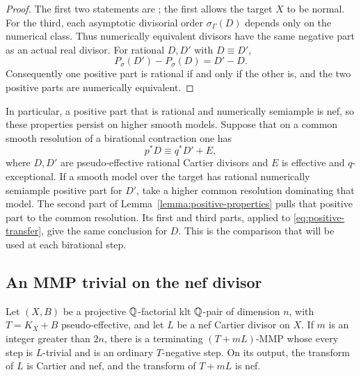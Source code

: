 \begin{proof}
The first two statements are \cite[Lemmas 2.4 and 2.5]{LP}; the first
allows the target $X$ to be normal.  For the third, each asymptotic
divisorial order $\sigma_\Gamma(D)$ depends only on the numerical class.
Thus numerically equivalent divisors have the same negative part as
an actual real divisor.  For rational $D,D'$ with $D\equiv D'$,
\[
                  P_\sigma(D')-P_\sigma(D)=D'-D.
\]
Consequently one positive part is rational if and only if the other
is, and the two positive parts are numerically equivalent.
\end{proof}

In particular, a positive part that is rational and numerically
semiample is nef, so these properties persist on higher smooth
models.  Suppose that on a common smooth resolution of a birational
contraction one has
\begin{equation}\label{eq:positive-transfer}
                         p^*D\equiv q^*D'+E,
\end{equation}
where $D,D'$ are pseudo-effective rational Cartier divisors and $E$
is effective and $q$-exceptional.  If a smooth model over the target
has rational numerically semiample positive part for $D'$, take a
higher common resolution dominating that model.  The second part of
Lemma~\ref{lemma:positive-properties} pulls that positive part to the
common resolution.  Its first and third parts, applied to
\eqref{eq:positive-transfer}, give the same conclusion for $D$.
This is the comparison that will be used at each birational step.

\subsection{An MMP trivial on the nef divisor}

\begin{lemma}\label{lemma:large-nef-adjoint}
Let $(X,B)$ be a projective $\mathbb Q$-factorial klt $\mathbb Q$-pair of
dimension $n$, with $T=K_X+B$ pseudo-effective, and let $L$ be a nef
Cartier divisor on $X$.  If $m$ is an integer greater than $2n$,
there is a terminating $(T+mL)$-MMP whose every step is $L$-trivial
and is an ordinary $T$-negative step.  On its output, the transform
of $L$ is Cartier and nef, and the transform of $T+mL$ is nef.
\end{lemma}

